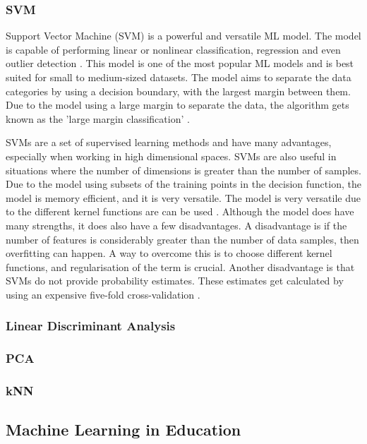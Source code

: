 	\subsubsection{SVM}
	Support Vector Machine (SVM) is a powerful and versatile ML model. The model is capable of performing linear or nonlinear classification, regression and even outlier detection \cite{geron2019hands, sklearn_svm}. This model is one of the most popular ML models and is best suited for small to medium-sized datasets. The model aims to separate the data categories by using a decision boundary, with the largest margin between them. Due to the model using a large margin to separate the data, the algorithm gets known as the 'large margin classification' \cite{geron2019hands}.
	
	SVMs are a set of supervised learning methods and have many advantages, especially when working in high dimensional spaces. SVMs are also useful in situations where the number of dimensions is greater than the number of samples. Due to the model using subsets of the training points in the decision function, the model is memory efficient, and it is very versatile. The model is very versatile due to the different kernel functions are can be used \cite{sklearn_svm}. Although the model does have many strengths, it does also have a few disadvantages. A disadvantage is if the number of features is considerably greater than the number of data samples, then overfitting can happen. A way to overcome this is to choose different kernel functions, and regularisation of the term is crucial. Another disadvantage is that SVMs do not provide probability estimates. These estimates get calculated by using an expensive five-fold cross-validation \cite{sklearn_svm}.
	
	\subsubsection{Linear Discriminant Analysis}
	
	\subsubsection{PCA}
	
	\subsubsection{kNN}
	
	
	\subsection{Machine Learning in Education}
		\label{seb_sec:ml_in_learning}
	
